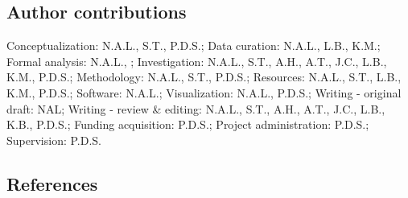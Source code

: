 \documentclass[
  12pt,
]{article}
\begin{document}
\hypertarget{author-contributions}{%
\subsection{Author contributions}\label{author-contributions}}

Conceptualization: N.A.L., S.T., P.D.S.; Data curation: N.A.L., L.B.,
K.M.; Formal analysis: N.A.L., ; Investigation: N.A.L., S.T., A.H.,
A.T., J.C., L.B., K.M., P.D.S.; Methodology: N.A.L., S.T., P.D.S.;
Resources: N.A.L., S.T., L.B., K.M., P.D.S.; Software: N.A.L.;
Visualization: N.A.L., P.D.S.; Writing - original draft: NAL; Writing -
review \& editing: N.A.L., S.T., A.H., A.T., J.C., L.B., K.B., P.D.S.;
Funding acquisition: P.D.S.; Project administration: P.D.S.;
Supervision: P.D.S.

\newpage

\hypertarget{references}{%
\subsection{References}\label{references}}
\end{document}
